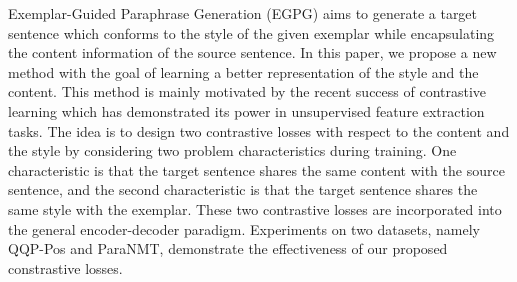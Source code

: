 Exemplar-Guided Paraphrase Generation (EGPG) aims to generate a target sentence which conforms to the style  of the given exemplar while encapsulating the content information of the source sentence. In this paper, we propose a new method with the goal of learning a better representation of the style and the content. This method is mainly motivated by the recent success of contrastive learning which has demonstrated its power in unsupervised feature extraction tasks. The idea is to design two contrastive losses with respect to the content and the style by considering two problem characteristics during training. One characteristic is that the target sentence shares the same content with the source sentence, and the second characteristic is that the target sentence shares the same style with the exemplar. These two contrastive losses are incorporated into the general encoder-decoder paradigm. Experiments on two datasets, namely QQP-Pos and ParaNMT, demonstrate the effectiveness of our proposed constrastive losses.
